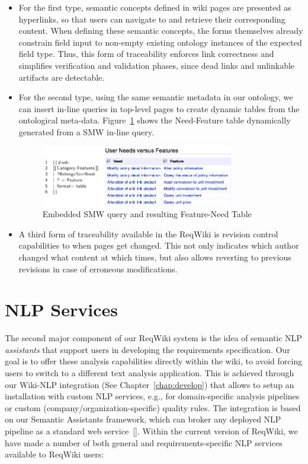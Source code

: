 \documentclass[10pt,twoside,openany,bibtotoc,liststotoc]{scrbook}
\newcommand{\sa}{Semantic Assistants\xspace}
\begin{document}
\begin{itemize}

\item For the first type, semantic concepts defined in wiki pages are presented as hyperlinks, so that users can navigate to and retrieve their corresponding content. When defining these semantic concepts, the forms themselves already constrain field input to non-empty existing ontology instances of the expected field type. Thus, this form of traceability enforces link correctness and simplifies verification and validation phases, since dead links and unlinkable artifacts are detectable.

\item For the second type, using the same semantic metadata in our ontology, we can insert in-line queries in top-level pages to create dynamic tables from the ontological meta-data. Figure~\ref{fig:traceability} shows the Need-Feature table dynamically generated from a SMW in-line query.

\begin{figure}[h!]
\centering
\includegraphics[width=0.8\textwidth]{traceability.png}
\caption{Embedded SMW query and resulting Feature-Need Table}
\label{fig:traceability}
\end{figure}

\item A third form of traceability available in the ReqWiki is revision control capabilities to when pages get changed. This not only indicates which author changed what content at which times, but also allows reverting to previous revisions in case of erroneous modifications.

\end{itemize}

\section{NLP Services}
The second major component of our ReqWiki system is the idea of semantic NLP \emph{assistants} that support users in developing the requirements specification. Our goal is to offer these analysis capabilities directly within the wiki, to avoid forcing users to switch to a different text analysis application. This is achieved through our Wiki-NLP integration (See Chapter~\ref{chap:develop}) that allows to setup an installation with custom NLP services, e.g., for domain-specific analysis pipelines or custom (company/organization-specific) quality rules. The integration is based on our \sa framework, which can broker any deployed NLP pipeline as a standard web service~[\cite{aswc08}]. Within the current version of ReqWiki, we have made a number of both general and requirements-specific NLP services available to ReqWiki users:
\end{document}
